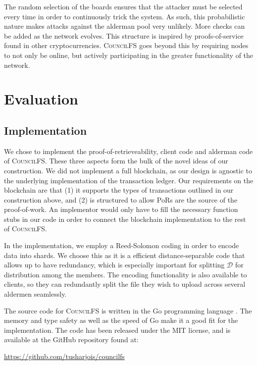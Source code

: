 \documentclass{article}
\begin{document}
The random selection of the boards ensures that the attacker must be selected
every time in order to continuously trick the system. As such, this probabilistic
nature makes attacks against the alderman pool very unlikely. More checks can be
added as the network evolves. This structure is inspired by proofs-of-service
\cite{proof-of-service} found in other cryptocurrencies. \textsc{CouncilFS} goes
beyond this by requiring nodes to not only be online, but actively participating
in the greater functionality of the network.

\section{Evaluation}

\subsection{Implementation}

We chose to implement the proof-of-retrieveability, client code and alderman
code of \textsc{CouncilFS}. These three aspects form the bulk of the novel ideas
of our construction. We did not implement a full blockchain, as our design is
agnostic to the underlying implementation of the transaction ledger. Our
requirements on the blockchain are that (1) it supports the types of
transactions outlined in our construction above, and (2) is structured to allow
PoRs are the source of the proof-of-work. An implementor would only have to fill
the necessary function stubs in our code in order to connect the blockchain
implementation to the rest of \textsc{CouncilFS}.

In the implementation, we employ a Reed-Solomon coding \cite{reed} in order to
encode data into shards. We choose this as it is a efficient distance-separable
code that allows up to have redundancy, which is especially important for
splitting $\mathcal{D}$ for distribution among the members. The encoding
functionality is also available to clients, so they can redundantly split the
file they wish to upload across several aldermen seamlessly. 

The source code for \textsc{CouncilFS} is written in the Go programming
language \cite{golang}. The memory and type safety as well as the speed of Go make it a good
fit for the implementation. The code has been released under the MIT license,
and is available at the GitHub repository found at:
\begin{center}
  \url{https://github.com/tusharjois/councilfs}
\end{center}
\end{document}
